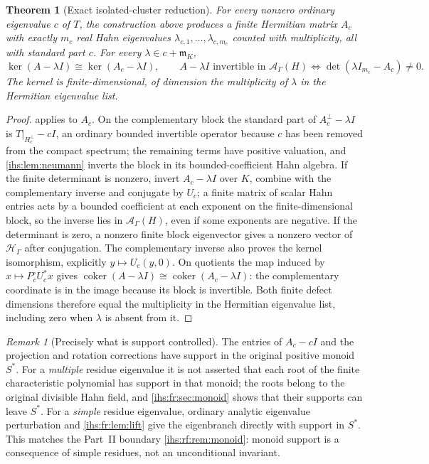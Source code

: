 \documentclass[11pt,a4paper]{article}
\numberwithin{equation}{section}
\newtheorem{theorem}{Theorem}[section]
\theoremstyle{definition}
\theoremstyle{remark}
\newtheorem{remark}[remark]{Remark}
\newcommand{\K}{K}
\newcommand{\mK}{\mathfrak m_K}
\newcommand{\Hil}{\mathcal H_\Gamma}
\newcommand{\Ahh}{\mathcal A_\Gamma(H)}
\newcommand{\coker}{\operatorname{coker}}
\begin{document}
\begin{theorem}[Exact isolated-cluster reduction]\label{ihs:fr:thm:cluster}
For every nonzero ordinary eigenvalue $c$ of $T$, the construction above
produces a finite Hermitian matrix $A_c$ with exactly $m_c$ real Hahn
eigenvalues $\lambda_{c,1},\ldots,\lambda_{c,m_c}$ counted with
multiplicity, all with standard part $c$. For every $\lambda\in c+\mK$,
\begin{equation}\label{ihs:fr:eq:clusterkernel}
 \ker(A-\lambda I)\cong\ker(A_c-\lambda I),\qquad
 A-\lambda I\text{ invertible in }\Ahh\iff\det(\lambda I_{m_c}-A_c)\ne0.
\end{equation}
The kernel is finite-dimensional, of dimension the multiplicity of
$\lambda$ in the Hermitian eigenvalue list.
\end{theorem}
\begin{proof}
 applies to $A_c$. On the complementary block the
standard part of $A_c^\perp-\lambda I$ is $T|_{H_c^\perp}-cI$, an ordinary
bounded invertible operator because $c$ has been removed from the compact
spectrum; the remaining terms have positive valuation, and
\cref{ihs:lem:neumann} inverts the block in its bounded-coefficient Hahn
algebra. If the finite determinant is nonzero, invert $A_c-\lambda I$ over
$\K$, combine with the complementary inverse and conjugate by $U_c$; a
finite matrix of scalar Hahn entries acts by a bounded coefficient at each
exponent on the finite-dimensional block, so the inverse lies in $\Ahh$,
even if some exponents are negative. If the determinant is zero, a nonzero
finite block eigenvector gives a nonzero vector of $\Hil$ after conjugation.
The complementary inverse also proves the kernel isomorphism, explicitly
$y\mapsto U_c(y,0)$. On quotients the map induced by
$x\mapsto P^\circ_cU_c^*x$ gives
$\coker(A-\lambda I)\cong\coker(A_c-\lambda I)$: the complementary
coordinate is in the image because its block is invertible. Both finite
defect dimensions therefore equal the multiplicity in the Hermitian
eigenvalue list, including zero when $\lambda$ is absent from it.
\end{proof}

\begin{remark}[Precisely what is support controlled]\label{ihs:fr:rem:support}
The entries of $A_c-cI$ and the projection and rotation corrections have
support in the original positive monoid $S^*$. For a \emph{multiple}
residue eigenvalue it is not asserted that each root of the finite
characteristic polynomial has support in that monoid; the roots belong to
the original divisible Hahn field, and \cref{ihs:fr:sec:monoid} shows that
their supports can leave $S^*$. For a \emph{simple} residue eigenvalue,
ordinary analytic eigenvalue perturbation and \cref{ihs:fr:lem:lift} give
the eigenbranch directly with support in $S^*$. This matches the Part~II
boundary \cref{ihs:rf:rem:monoid}: monoid support is a consequence of simple
residues, not an unconditional invariant.
\end{remark}
\end{document}
